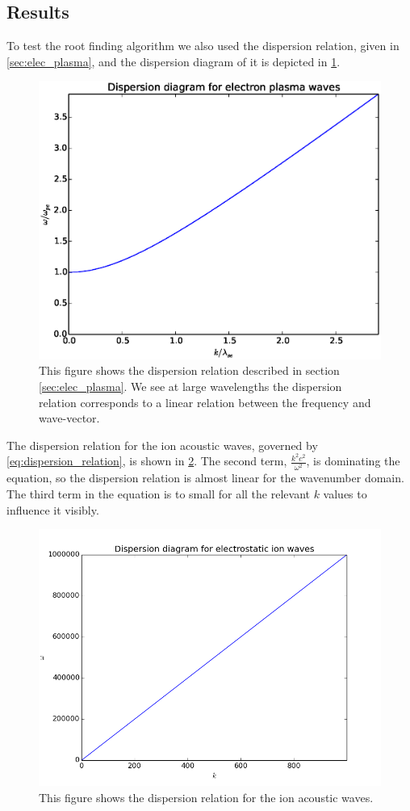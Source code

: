 \documentclass[x11names]{article}
\begin{document}
\subsection{Results}
  To test the root finding algorithm we also used the dispersion relation, given in \cref{sec:elec_plasma}, and the dispersion diagram of it is depicted in \cref{fig:simple_diagram}. 

  \begin{figure}
  \centering
    \includegraphics[width = 0.60 \textwidth]{figures/simple_dispersion}
    \caption{This figure shows the dispersion relation described in section \cref{sec:elec_plasma}. We see at large wavelengths the dispersion relation corresponds to a linear relation between the frequency and wave-vector.}
    \label{fig:simple_diagram}
  \end{figure}


  The dispersion relation for the ion acoustic waves, governed by \cref{eq:dispersion_relation}, is shown in \cref{fig:ionAcousticDispers}. The second term, \(\frac{k^2c^2}{\omega^2}\), is dominating the equation, so the dispersion relation is almost linear for the wavenumber domain. The third term in the equation is to small for all the relevant \(k\) values to influence it visibly.
  \begin{figure}
  \centering
    \includegraphics[width = 0.60 \textwidth]{figures/ionAcousticWaves}
    \caption{This figure shows the dispersion relation for the ion acoustic waves.}
    \label{fig:ionAcousticDispers}
  \end{figure}
\end{document}
